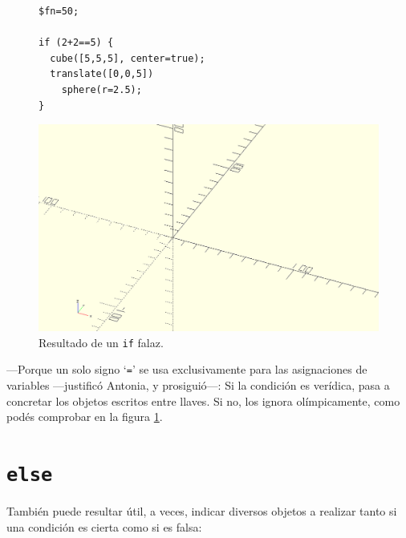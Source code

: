 \begin{figure}[ht]
\begin{minipage}[]{.5\textwidth}%
  \begin{lstlisting}
$fn=50;
    
if (2+2==5) {
  cube([5,5,5], center=true);
  translate([0,0,5])
    sphere(r=2.5);
}
\end{lstlisting}%
\end{minipage}
\begin{minipage}[]{.49\textwidth}%

  \centering
  \includegraphics[width=.7\textwidth]{imagenes/vacio}
    \end{minipage}
  \caption{Resultado de un \lstinline!if! falaz.}
  \label{fig:if-vacio}
\end{figure}

---Porque un solo signo `\texttt{=}' se usa exclusivamente para las
asignaciones de variables ---justificó Antonia, y
pro\-si\-\mbox{guió---}: Si la condición es verídica, \openscad{} pasa
a concretar los objetos escritos entre llaves. Si no, los ignora
olímpicamente, como podés comprobar en la figura \ref{fig:if-vacio}.

\section{\texttt{else}}

\guillemotright También puede resultar útil, a veces, indicar diversos
objetos a realizar tanto si una condición es cierta como si es falsa:

